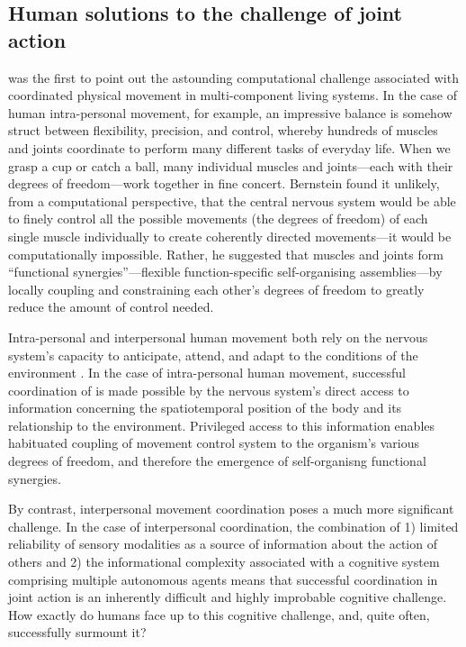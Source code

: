 \begin{CJK}{UTF8}{gbsn}
\section{Human solutions to the challenge of joint action\label{sect:dfProblem}}
\textcite{Bernstein1967} was the first to point out the astounding computational challenge associated with coordinated physical movement in multi-component living systems.  In the case of human intra-personal movement, for example, an impressive balance is somehow struct between flexibility, precision, and control, whereby hundreds of muscles and joints coordinate to perform many different tasks of everyday life.  When we grasp a cup or catch a ball, many individual muscles and joints---each with their degrees of freedom---work together in fine concert.  Bernstein found it unlikely, from a computational perspective, that the central nervous system would be able to finely control all the possible movements (the degrees of freedom) of each single muscle individually to create coherently directed movements---it would be computationally impossible.  Rather, he suggested that muscles and joints form  ``functional synergies''---flexible function-specific self-organising assemblies---by locally coupling and constraining each other’s degrees of freedom to greatly reduce the amount of control needed.

Intra-personal and interpersonal human movement both rely on the nervous system’s capacity to anticipate, attend, and adapt to the conditions of the environment \citep{Keller2014}.  In the case of intra-personal human movement, successful coordination of is made possible by the nervous system's direct access to information concerning the spatiotemporal position of the body and its relationship to the environment.  Privileged access to this information enables habituated coupling of movement control system to the organism's various degrees of freedom, and therefore the emergence of self-organisng functional synergies.

By contrast, interpersonal movement coordination poses a much more significant challenge.  In the case of interpersonal coordination, the combination of 1) limited reliability of sensory modalities as a source of information about the action of others \citep{Wilson2005,Wolpert2003,Frith2007} and 2) the informational complexity associated with a cognitive system comprising multiple autonomous agents \citep{Bernstein1967} means that successful coordination in joint action is an inherently difficult and highly improbable cognitive challenge.  How exactly do humans face up to this cognitive challenge, and, quite often, successfully surmount it?


\end{CJK}
